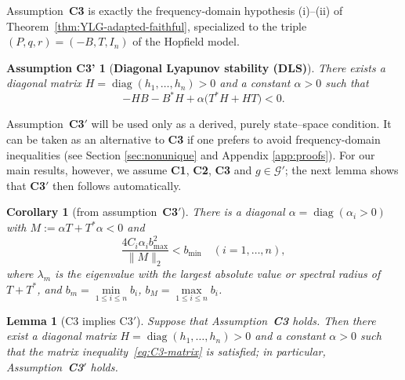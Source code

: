 \documentclass[journal]{IEEEtran}
\theoremstyle{myplain}
\newtheorem{lemma}{Lemma}
\newtheorem{corollary}{Corollary}
\newtheorem*{assumption3mat}{Assumption C3'}
\begin{document}
Assumption~\textbf{C3} is exactly the frequency-domain hypothesis
\textup{(i)}–\textup{(ii)} of Theorem~\ref{thm:YLG-adapted-faithful},
specialized to the triple $(P,q,r)=(-B,T,I_n)$ of the Hopfield model.


\begin{assumption3mat}[\bf Diagonal Lyapunov stability (DLS)]\label{ass:C3}
There exists a diagonal matrix $H=\operatorname{diag}(h_1,\dots,h_n) > 0$
and a constant $\alpha > 0$ such that
\begin{equation}\label{eq:C3-matrix}
  -HB - B^{*}H + \alpha\bigl(T^{*}H + HT\bigr) < 0 .
\end{equation}
\end{assumption3mat}

Assumption~\textbf{C3$'$} will be used only as a derived, purely
state–space condition.  It can be taken as an alternative to
\textbf{C3} if one prefers to avoid frequency-domain inequalities (see Section \ref{sec:nonunique} and Appendix \ref{app:proofs}).
For our main results, however, we assume \textbf{C1}, \textbf{C2},
\textbf{C3} and $g\in\mathcal G'$; the next lemma shows that
\textbf{C3$'$} then follows automatically.

\begin{corollary}[from assumption~\textbf{C3$'$}]\label{col_from_C3}
There is a diagonal $\alpha=\operatorname{diag}(\alpha_i>0)$ with $M:=\alpha T+T^{\!*}\alpha<0$ and
    \begin{equation*}
      \frac{4C_i\alpha_i b^{2}_{\max}}{\|M\|_{2}}<b_{\min}\quad(i=1,\dots,n),
    \end{equation*}
where $\lambda_m$ is the eigenvalue with the largest absolute value or spectral radius of $T+T^{\!*}$, and $b_m=\min\limits_{1\leq i \leq n}b_i$, $b_M=\max\limits_{1\leq i \leq n}b_i$.
\end{corollary}

\begin{lemma}[C3 implies C3$'$]\label{lem:C3prime-implies-C3}
Suppose that Assumption~\textbf{C3} holds. Then there exist a
diagonal matrix $H=\operatorname{diag}(h_1,\dots,h_n)> 0$ and a constant
$\alpha>0$ such that the matrix inequality~\eqref{eq:C3-matrix} is
satisfied; in particular, Assumption~\textbf{C3$'$} holds.
\end{lemma}
\end{document}
